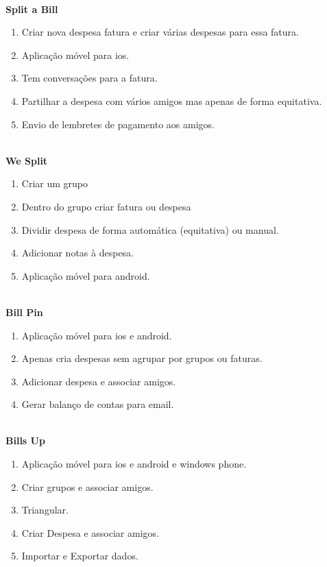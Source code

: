\textbf{\\Split a Bill}
\begin{enumerate}
\item Criar nova despesa fatura e criar várias despesas para essa fatura.
\item Aplicação móvel para ios.
\item Tem conversações para a fatura.
\item Partilhar a despesa com vários amigos mas apenas de forma equitativa.
\item Envio de lembretes de pagamento aos amigos.
\end{enumerate}

\textbf{\\We Split}
\begin{enumerate}
\item Criar um grupo
\item Dentro do grupo criar fatura ou despesa
\item Dividir despesa de forma automática (equitativa) ou manual.
\item Adicionar notas à despesa.
\item Aplicação móvel para android.
\end{enumerate}

\textbf{\\Bill Pin}
\begin{enumerate}
\item Aplicação móvel para ios e android.
\item Apenas cria despesas sem agrupar por grupos ou faturas.
\item Adicionar despesa e associar amigos.
\item Gerar balanço de contas para email.
\end{enumerate}

\textbf{\\Bills Up}
\begin{enumerate}
\item Aplicação móvel para ios e android e windows phone.
\item Criar grupos e associar amigos.
\item Triangular.
\item Criar Despesa e associar amigos.
\item Importar e Exportar dados.
\end{enumerate}
